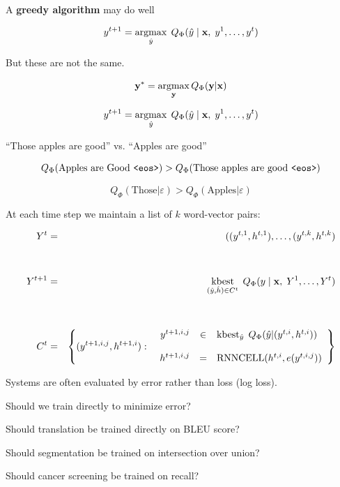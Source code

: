 {\vfill
A {\bf greedy algorithm} may do well

\vfill
$$y^{t+1} = \operatorname*{argmax}_{\hat{y}}\; Q_\Phi(\hat{y}\;|\;{\bf x},\;y^1,\ldots,y^t)$$

\vfill
But these are not the same.


$${\bf y}^* = \operatorname*{argmax}_{\bf y} Q_\Phi({\bf y}|{\bf x})$$

$$y^{t+1} = \operatorname*{argmax}_{\hat{y}}\; Q_\Phi(\hat{y}\;|\;{\bf x},\;y^1,\ldots,y^t)$$

\vfill
\vfill
``Those apples are good'' vs. ``Apples are good''

\vfill
$$Q_\Phi(\mbox{Apples are Good {\tt <eos>}}) > Q_\Phi(\mbox{Those apples are good {\tt <eos>}})$$

\vfill
$$Q_\Phi(\mbox{Those}|\varepsilon) > Q_\Phi(\mbox{Apples}|\varepsilon)$$
    

At each time step we maintain a list of $k$ word-vector pairs:

\vfill
\begin{eqnarray*}
  Y^t & = & ((y^{t,1},h^{t,1}),\ldots,(y^{t,k},h^{t,k}) \\
  \\
  \\
  Y^{t+1} & = & \operatorname*{kbest}_{(\hat{y},\hat{h})\in C^t} \; Q_\Phi(y\; |\; {\bf x},\;Y^1,\ldots,Y^t) \\
  \\
  \\
  C^t & = & \left\{(y^{t+1,i,j},h^{t+1,i}):\;\;\begin{array}{rcl}
  y^{t+1,i,j} & \in & \operatorname*{kbest}_{\hat{y}}\;Q_\Phi(\hat{y}|(y^{t,i},h^{t,i})) \\
  \\
  h^{t+1,i,j} & = & \mathrm{RNNCELL}(h^{t,i},e(y^{t,i,j}))
  \end{array}\right\}
  \end{eqnarray*}


Systems are often evaluated by error rather than loss (log loss).

\vfill
Should we train directly to minimize error?

\vfill
Should translation be trained directly on BLEU score?

\vfill
Should segmentation be trained on intersection over union?

\vfill
Should cancer screening be trained on  recall?

}
